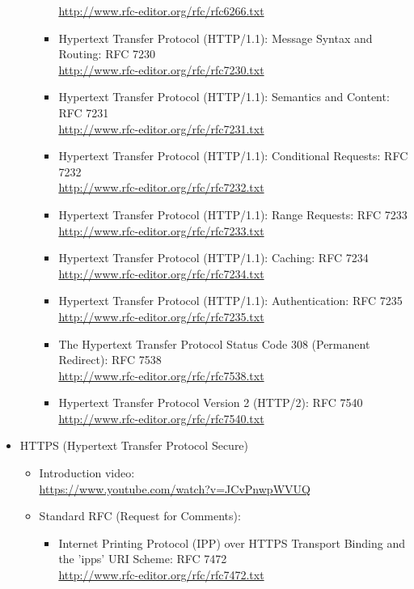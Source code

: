 \begin{itemize}
\begin{itemize}
\begin{itemize}
\url{http://www.rfc-editor.org/rfc/rfc6266.txt}
\item Hypertext Transfer Protocol (HTTP/1.1): Message Syntax and Routing: 
RFC 7230\\
\url{http://www.rfc-editor.org/rfc/rfc7230.txt}
\item Hypertext Transfer Protocol (HTTP/1.1): Semantics and Content: RFC 7231\\
\url{http://www.rfc-editor.org/rfc/rfc7231.txt}
\item Hypertext Transfer Protocol (HTTP/1.1): Conditional Requests: RFC 7232\\
\url{http://www.rfc-editor.org/rfc/rfc7232.txt}
\item Hypertext Transfer Protocol (HTTP/1.1): Range Requests: RFC 7233\\
\url{http://www.rfc-editor.org/rfc/rfc7233.txt}
\item Hypertext Transfer Protocol (HTTP/1.1): Caching: RFC 7234\\
\url{http://www.rfc-editor.org/rfc/rfc7234.txt}
\item Hypertext Transfer Protocol (HTTP/1.1): Authentication: RFC 7235\\
\url{http://www.rfc-editor.org/rfc/rfc7235.txt}
\item The Hypertext Transfer Protocol Status Code 308 (Permanent Redirect): 
RFC 7538\\
\url{http://www.rfc-editor.org/rfc/rfc7538.txt}
\item Hypertext Transfer Protocol Version 2 (HTTP/2): RFC 7540\\
\url{http://www.rfc-editor.org/rfc/rfc7540.txt}
\end{itemize}
\end{itemize}
\item HTTPS (Hypertext Transfer Protocol Secure)\\
\begin{itemize}
\item Introduction video:\\
\url{https://www.youtube.com/watch?v=JCvPnwpWVUQ}
\item Standard RFC (Request for Comments): \\
\begin{itemize}
\item Internet Printing Protocol (IPP) over HTTPS Transport Binding 
and the 'ipps' URI Scheme: RFC 7472 \\
\url{http://www.rfc-editor.org/rfc/rfc7472.txt}
\end{itemize}

\end{itemize}
\end{itemize}
